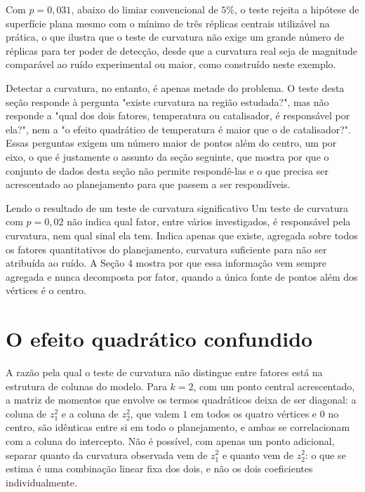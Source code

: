 \documentclass{doeapostila}
\begin{document}
\noindent
Com $p = 0{,}031$, abaixo do limiar convencional de $5\%$, o teste rejeita a
hipótese de superfície plana mesmo com o mínimo de três réplicas centrais
utilizável na prática, o que ilustra que o teste de curvatura não exige um
grande número de réplicas para ter poder de detecção, desde que a curvatura
real seja de magnitude comparável ao ruído experimental ou maior, como
construído neste exemplo.

Detectar a curvatura, no entanto, é apenas metade do problema. O teste
desta seção responde à pergunta "existe curvatura na região estudada?",
mas não responde a "qual dos dois fatores, temperatura ou catalisador, é
responsável por ela?", nem a "o efeito quadrático de temperatura é maior
que o de catalisador?". Essas perguntas exigem um número maior de pontos
além do centro, um por eixo, o que é justamente o assunto da seção
seguinte, que mostra por que o conjunto de dados desta seção não permite
respondê-las e o que precisa ser acrescentado ao planejamento para que
passem a ser respondíveis.

\begin{aplicacao}{Lendo o resultado de um teste de curvatura significativo}
Um teste de curvatura com $p = 0{,}02$ não indica qual fator, entre vários
investigados, é responsável pela curvatura, nem qual sinal ela tem. Indica
apenas que existe, agregada sobre todos os fatores quantitativos do
planejamento, curvatura suficiente para não ser atribuída ao ruído. A Seção 4
mostra por que essa informação vem sempre agregada e nunca decomposta por
fator, quando a única fonte de pontos além dos vértices é o centro.
\end{aplicacao}

\section{O efeito quadrático confundido}

A razão pela qual o teste de curvatura não distingue entre fatores está na
estrutura de colunas do modelo. Para $k=2$, com um ponto central
acrescentado, a matriz de momentos que envolve os termos quadráticos deixa
de ser diagonal: a coluna de $z_{1}^{2}$ e a coluna de $z_{2}^{2}$, que valem
$1$ em todos os quatro vértices e $0$ no centro, são idênticas entre si em
todo o planejamento, e ambas se correlacionam com a coluna do intercepto.
Não é possível, com apenas um ponto adicional, separar quanto da curvatura
observada vem de $z_{1}^{2}$ e quanto vem de $z_{2}^{2}$: o que se estima é
uma combinação linear fixa dos dois, e não os dois coeficientes
individualmente.
\end{document}
